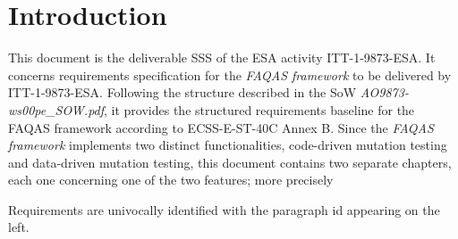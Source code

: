 
\section{Introduction}
\label{sec:introduction}

This document is the deliverable SSS of the ESA activity ITT-1-9873-ESA. It concerns requirements specification for the \emph{FAQAS framework} to be delivered by ITT-1-9873-ESA. Following the structure described in the SoW \emph{AO9873-ws00pe\_SOW.pdf}, it provides the structured requirements baseline for the FAQAS framework according to ECSS-E-ST-40C Annex B. Since the \emph{FAQAS framework} implements two distinct functionalities, code-driven mutation testing and data-driven mutation testing, this document contains two separate chapters, each one concerning one of the two features; more precisely 


Requirements are univocally identified with the paragraph id appearing on the left.
 
 
 

